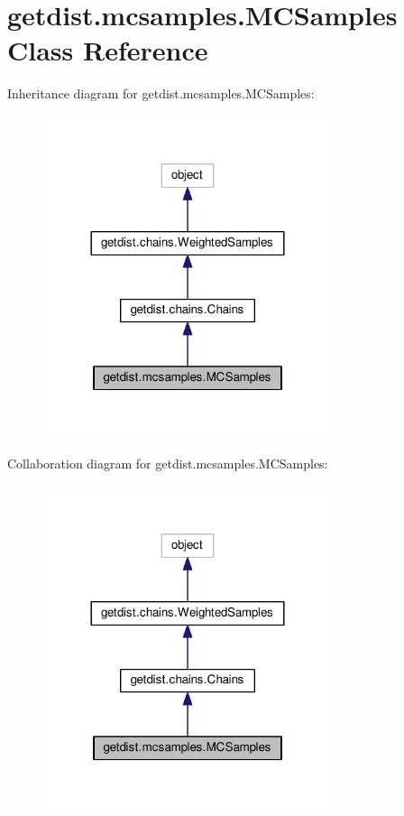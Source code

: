 \hypertarget{classgetdist_1_1mcsamples_1_1MCSamples}{}\section{getdist.\+mcsamples.\+M\+C\+Samples Class Reference}
\label{classgetdist_1_1mcsamples_1_1MCSamples}


Inheritance diagram for getdist.\+mcsamples.\+M\+C\+Samples\+:
\nopagebreak
\begin{figure}[H]
\begin{center}
\leavevmode
\includegraphics[width=240pt]{classgetdist_1_1mcsamples_1_1MCSamples__inherit__graph}
\end{center}
\end{figure}


Collaboration diagram for getdist.\+mcsamples.\+M\+C\+Samples\+:
\nopagebreak
\begin{figure}[H]
\begin{center}
\leavevmode
\includegraphics[width=240pt]{classgetdist_1_1mcsamples_1_1MCSamples__coll__graph}
\end{center}
\end{figure}
